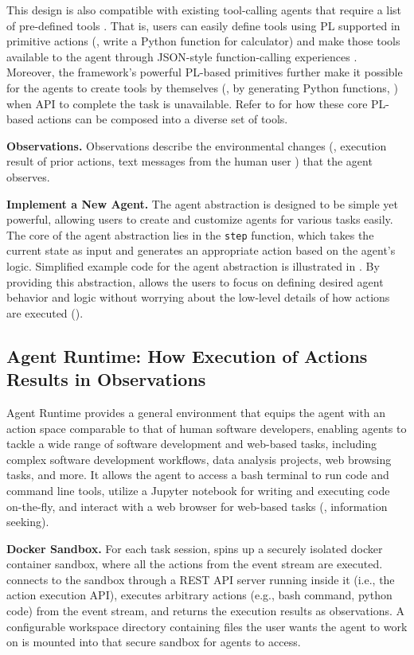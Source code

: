 This design is also compatible with existing tool-calling agents that require a list of pre-defined tools \citep{langchain2022}. That is, users can easily define tools using PL supported in primitive actions (\eg, write a Python function for calculator) and make those tools available to the agent through JSON-style function-calling experiences \citep{toolbench}.
Moreover, the framework's powerful PL-based primitives further make it possible for the agents to create tools by themselves (\eg, by generating Python functions, \citealt{craft}) when API to complete the task is unavailable.
Refer to  for how these core PL-based actions can be composed into a diverse set of tools.

\noindent \textbf{Observations.} Observations describe the environmental changes (\eg, execution result of prior actions, text messages from the human user \etc) that the agent observes. 

\noindent \textbf{Implement a New Agent.} 
The agent abstraction is designed to be simple yet powerful, allowing users to create and customize agents for various tasks easily.
The core of the agent abstraction lies in the \texttt{step} function, which takes the current state as input and generates an appropriate action based on the agent's logic. Simplified example code for the agent abstraction is illustrated in .
By providing this abstraction, \projname allows the users to focus on defining desired agent behavior and logic without worrying about the low-level details of how actions are executed ().


\subsection{Agent Runtime: How Execution of Actions Results in Observations}
\label{sec:agent-runtime}


Agent Runtime provides a general environment that equips the agent with an action space comparable to that of human software developers, enabling \projname agents to tackle a wide range of software development and web-based tasks, including complex software development workflows, data analysis projects, web browsing tasks, and more.
It allows the agent to access a bash terminal to run code and command line tools, utilize a Jupyter notebook for writing and executing code on-the-fly, and interact with a web browser for web-based tasks (\eg, information seeking). 

\noindent \textbf{Docker Sandbox.} For each task session, \projname spins up a securely isolated docker container sandbox, where all the actions from the event stream are executed.
\projname connects to the sandbox through a REST API server running inside it (i.e., the \projname action execution API), executes arbitrary actions (e.g., bash command, python code) from the event stream, and returns the execution results as observations.
A configurable workspace directory containing files the user wants the agent to work on is mounted into that secure sandbox for \projname agents to access.

